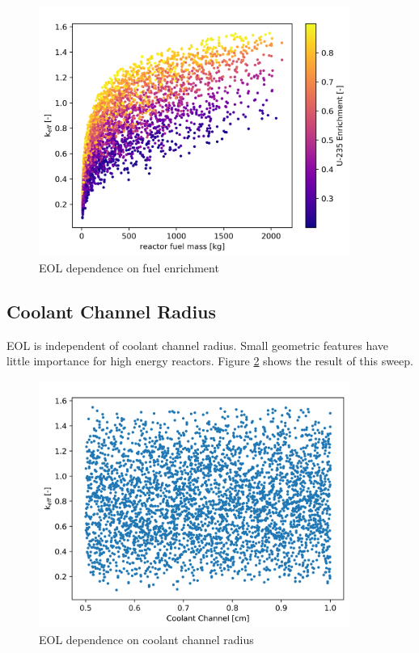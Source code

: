 \begin{figure}[h]
    \centering
    \includegraphics[width=4in]{../images/keff_vs_mass_enrich.png}
\caption{EOL \keff dependence on fuel enrichment}
\label{fig:eol_keff_vs_mass_enrich}
\end{figure}


\subsection{Coolant Channel Radius}
EOL \keff is independent of coolant channel radius. Small geometric features
have little importance for high energy reactors. Figure
\ref{fig:eol_keff_vs_r_cool} shows the result of this sweep.

\begin{figure}[h]
    \centering
    \includegraphics[width=4in]{../images/keff_vs_cool_r.png}
\caption{EOL \keff dependence on coolant channel radius}
\label{fig:eol_keff_vs_r_cool}
\end{figure}

